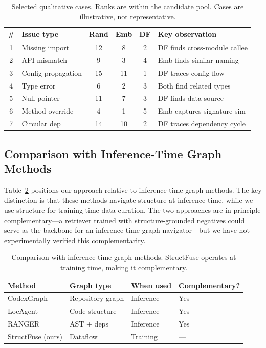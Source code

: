 \documentclass[11pt]{article}
\newcommand{\sysname}{StructFuse}
\begin{document}
\begin{table}[t]
\centering
\caption{Selected qualitative cases. Ranks are within the candidate pool. Cases are illustrative, not representative.}
\label{tab:cases}
\begin{tabular}{clcccl}
\toprule
\# & Issue type & Rand & Emb & DF & Key observation \\
\midrule
1 & Missing import     & 12 & 8 & 2 & DF finds cross-module callee \\
2 & API mismatch       &  9 & 3 & 4 & Emb finds similar naming \\
3 & Config propagation & 15 & 11 & 1 & DF traces config flow \\
4 & Type error         &  6 & 2 & 3 & Both find related types \\
5 & Null pointer       & 11 & 7 & 3 & DF finds data source \\
6 & Method override    &  4 & 1 & 5 & Emb captures signature sim \\
7 & Circular dep       & 14 & 10 & 2 & DF traces dependency cycle \\
\bottomrule
\end{tabular}
\end{table}

\subsection{Comparison with Inference-Time Graph Methods}
\label{sec:inference-comparison}

Table~\ref{tab:inference-methods} positions our approach relative to inference-time graph methods.
The key distinction is that these methods navigate structure at inference time, while we use structure for training-time data curation.
The two approaches are in principle complementary---a retriever trained with structure-grounded negatives could serve as the backbone for an inference-time graph navigator---but we have not experimentally verified this complementarity.

\begin{table}[t]
\centering
\caption{Comparison with inference-time graph methods. StructFuse operates at training time, making it complementary.}
\label{tab:inference-methods}
\begin{tabular}{llll}
\toprule
Method & Graph type & When used & Complementary? \\
\midrule
CodexGraph & Repository graph & Inference & Yes \\
LocAgent   & Code structure   & Inference & Yes \\
RANGER     & AST + deps       & Inference & Yes \\
\sysname{} (ours) & Dataflow  & Training  & --- \\
\bottomrule
\end{tabular}
\end{table}
\end{document}
